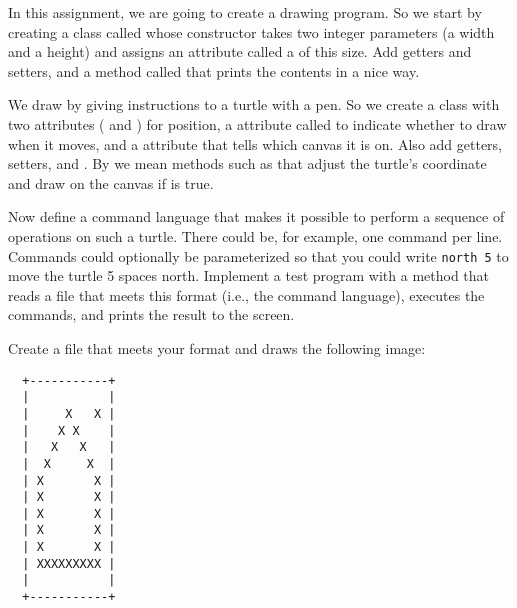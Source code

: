In this assignment, we are going to create a drawing program. So we start by creating a class called  whose constructor takes two integer parameters (a width and a height) and assigns an attribute called  a  of this size. Add getters and setters, and a method called  that prints the contents in a nice way.

We draw by giving instructions to a turtle with a pen. So we create a  class with two  attributes ( and ) for position, a  attribute called  to indicate whether to draw when it moves, and a  attribute that tells which canvas it is on. Also add getters, setters, and . By  we mean methods such as  that adjust the turtle's coordinate and draw on the canvas if  is true.

Now define a command language that makes it possible to perform a sequence of operations on such a turtle. There could be, for example, one command per line. Commands could optionally be parameterized so that you could write \texttt{north 5} to move the turtle 5 spaces north. Implement a test program with a  method that reads a file that meets this format (i.e., the command language), executes the commands, and prints the result to the screen.

Create a file that meets your format and draws the following image:
\begin{verbatim}
  +-----------+
  |           |
  |     X   X |
  |    X X    |
  |   X   X   |
  |  X     X  |
  | X       X |
  | X       X |
  | X       X |
  | X       X |
  | X       X |
  | XXXXXXXXX |
  |           |
  +-----------+
\end{verbatim}
